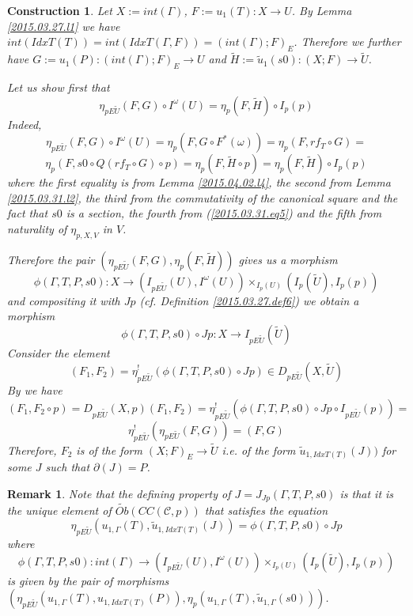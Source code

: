 \documentclass[12pt]{article}
\newtheorem{remark}[proposition]{Remark}
\newtheorem{construction}[proposition]{Construction}
\newcommand{\llabel}[1]{\label{#1}}
\newcommand{\sr}{\rightarrow}
\newcommand{\wt}{\widetilde}
\begin{document}
\begin{construction}\rm
\llabel{2015.04.04.constr1}
Let $X:=int(\Gamma)$, $F:=u_1(T):X\sr U$. By Lemma \ref{2015.03.27.l1} we have $int(IdxT(T))=int(IdxT(\Gamma,F))=(int(\Gamma);F)_{E}$. Therefore we further have
$G:=u_1(P):(int(\Gamma);F)_{E}\sr U$ and $\wt{H}:=\wt{u}_1(s0):(X;F)\sr \wt{U}$. 

Let us show first that
%
$$\eta_{pE\wt{U}}(F,G)\circ I^{\omega}(U)=\eta_p(F,\wt{H})\circ I_p(p)$$
%
Indeed,
%
$$\eta_{pE\wt{U}}(F,G)\circ I^{\omega}(U)=\eta_p(F,G\circ F^*(\omega))=\eta_p(F,rf_T\circ G)=$$
$$\eta_p(F,s0\circ Q(rf_T\circ G)\circ p)=\eta_p(F,\wt{H}\circ p)=\eta_p(F,\wt{H})\circ I_p(p)$$
%
where the first equality is from Lemma \ref{2015.04.02.l4}, the second from Lemma \ref{2015.03.31.l2}, the third from the commutativity of the canonical square and the fact that $s0$ is a section, the fourth from (\ref{2015.03.31.eq5}) and the fifth from naturality of $\eta_{p,X,V}$ in $V$. 

Therefore the pair $(\eta_{pE\wt{U}}(F,G),\eta_p(F,\wt{H}))$ gives us a morphism
%
$$\phi(\Gamma,T,P,s0):X\sr (I_{pE\wt{U}}(U), I^{\omega}(U)) \times_{I_p(U)} (I_p(\wt{U}),I_p(p))$$
%
and compositing it with $Jp$ (cf. Definition \ref{2015.03.27.def6}) we obtain a morphism 
%
$$\phi(\Gamma,T,P,s0)\circ Jp: X\sr I_{pE\wt{U}}(\wt{U})$$
%
Consider the element 
%
$$(F_1,F_2)=\eta^!_{pE\wt{U}}(\phi(\Gamma,T,P,s0)\circ Jp)\in D_{pE\wt{U}}(X,\wt{U})$$
%
By \cite[Problem 3.8(1)]{fromunivwithPi} we have 
%
$$(F_1,F_2\circ p)=D_{pE\wt{U}}(X,p)(F_1,F_2)=\eta^!_{pE\wt{U}}(\phi(\Gamma,T,P,s0)\circ Jp\circ I_{pE\wt{U}}(p))=$$
%
$$\eta^!_{pE\wt{U}}(\eta_{pE\wt{U}}(F,G))=(F,G)$$
%
Therefore, $F_2$ is of the form $(X;F)_E\sr \wt{U}$ i.e. of the form $\wt{u}_{1,IdxT(T)}(J))$ for some $J$ such that $\partial(J)=P$. 
\end{construction}
%
\begin{remark}\rm
\llabel{2015.05.08.rem1}
Note that the defining property of $J=J_{Jp}(\Gamma,T,P,s0)$ is that it is the unique element of $\wt{Ob}(CC({\mathcal C},p))$ that satisfies the equation
%
$$\eta_{pE\wt{U}}(u_{1,\Gamma}(T),\wt{u}_{1,IdxT(T)}(J))=\phi(\Gamma,T,P,s0)\circ Jp$$
%
where 
%
$$\phi(\Gamma,T,P,s0):int(\Gamma)\sr (I_{pE\wt{U}}(U),I^{\omega}(U))\times_{I_p(U)}(I_p(\wt{U}),I_p(p))$$
%
is given by the pair of morphisms $(\eta_{pE\wt{U}}(u_{1,\Gamma}(T), u_{1,IdxT(T)}(P)), \eta_p(u_{1,\Gamma}(T),\wt{u}_{1,\Gamma}(s0)))$.
\end{remark}
%
\end{document}
